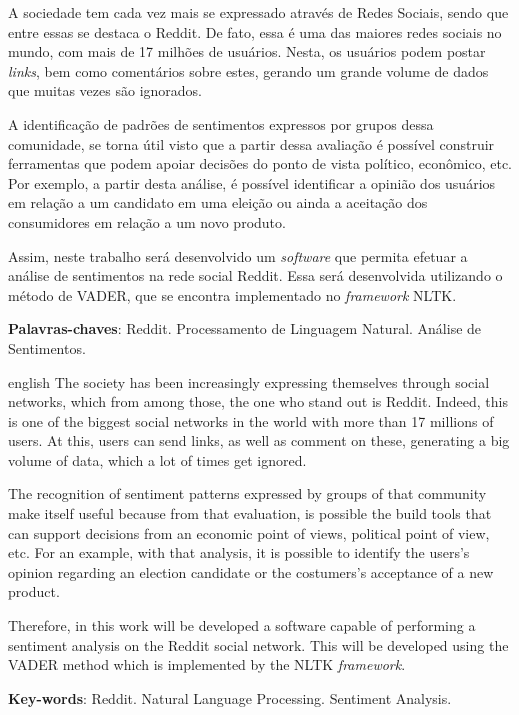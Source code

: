\setlength{\absparsep}{18pt} %
\begin{resumo}
A sociedade tem cada vez mais se expressado através de Redes
Sociais, sendo que entre essas se destaca o
Reddit. De fato, essa é uma das maiores redes sociais no mundo, com mais de 17
milhões de usuários. Nesta, os usuários podem postar \textit{links}, bem como
comentários sobre estes, gerando um grande volume de dados que muitas vezes são
ignorados.

A identificação de padrões de sentimentos expressos por grupos dessa comunidade,
se torna útil visto que a partir dessa avaliação é possível construir
ferramentas que podem apoiar decisões do ponto de vista político, econômico, etc. Por exemplo, a partir desta análise, é
possível identificar a opinião dos usuários em relação a um candidato em uma eleição ou ainda a aceitação dos
consumidores em relação a um novo produto.

Assim, neste trabalho será desenvolvido um \textit{software} que permita efetuar
a análise de sentimentos na rede social Reddit. Essa será desenvolvida
utilizando o método de \ac{VADER}, que se encontra implementado no
\textit{framework} \ac{NLTK}.


 \textbf{Palavras-chaves}: Reddit. Processamento de Linguagem Natural. Análise de Sentimentos.
\end{resumo}

\begin{resumo}[Abstract]
 \begin{otherlanguage*}{english}
   The society has been increasingly expressing themselves through social networks,
which from among those, the one who stand out is Reddit. Indeed, this is one of
the biggest social networks in the world with more than 17 millions of users. At
this, users can send links, as well as comment on these, generating a big volume
of data, which a lot of times get ignored.

The recognition of sentiment patterns expressed by groups of that community
make itself useful because from that evaluation, is possible the build tools
that can support decisions from an economic point of views, political
point of view, etc. For an example, with that
analysis, it is possible to identify the users's opinion regarding an election candidate or the costumers's acceptance of a new product.

Therefore, in this work will be developed a software capable of performing a
sentiment analysis on the Reddit social network. This will be developed using
the \ac{VADER} method which is implemented by the \ac{NLTK} \textit{framework}.

   \vspace{\onelineskip}
 
   \noindent 
   \textbf{Key-words}: Reddit. Natural Language Processing. Sentiment
Analysis.
 \end{otherlanguage*}
\end{resumo}
